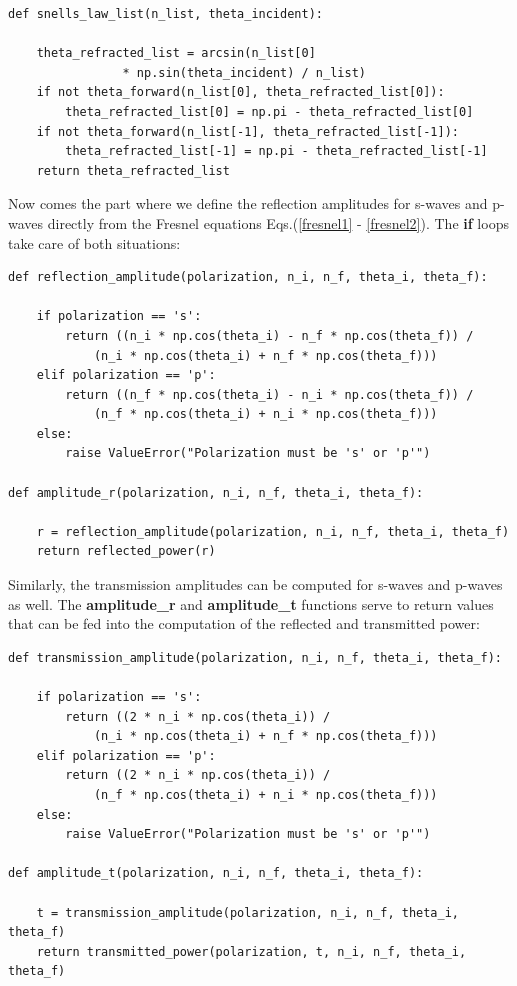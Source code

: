 \documentclass[preprint, onecolumn, amsmath, amssymb, aps]{revtex4-1}
\numberwithin{equation}{section}
\begin{document}
\lstset{showspaces=false,showstringspaces=false}%
\begin{lstlisting}
def snells_law_list(n_list, theta_incident):

	theta_refracted_list = arcsin(n_list[0] 
				* np.sin(theta_incident) / n_list)
	if not theta_forward(n_list[0], theta_refracted_list[0]):
		theta_refracted_list[0] = np.pi - theta_refracted_list[0]
	if not theta_forward(n_list[-1], theta_refracted_list[-1]):
		theta_refracted_list[-1] = np.pi - theta_refracted_list[-1]
	return theta_refracted_list
\end{lstlisting}
\noindent
Now comes the part where we define the reflection amplitudes for s-waves and p-waves directly from the Fresnel equations Eqs.(\ref{fresnel1} - \ref{fresnel2}). The \textbf{if} loops take care of both situations: 
\lstset{showspaces=false,showstringspaces=false}%
\begin{lstlisting}
def reflection_amplitude(polarization, n_i, n_f, theta_i, theta_f):

	if polarization == 's':
		return ((n_i * np.cos(theta_i) - n_f * np.cos(theta_f)) /
			(n_i * np.cos(theta_i) + n_f * np.cos(theta_f)))
	elif polarization == 'p':
		return ((n_f * np.cos(theta_i) - n_i * np.cos(theta_f)) /
			(n_f * np.cos(theta_i) + n_i * np.cos(theta_f)))
	else:
		raise ValueError("Polarization must be 's' or 'p'")

def amplitude_r(polarization, n_i, n_f, theta_i, theta_f):

	r = reflection_amplitude(polarization, n_i, n_f, theta_i, theta_f)
	return reflected_power(r)
\end{lstlisting}
\noindent
Similarly, the transmission amplitudes can be computed for s-waves and p-waves as well. The \textbf{amplitude\_r} and \textbf{amplitude\_t} functions serve to return values that can be fed into the computation of the reflected and transmitted power:
\lstset{showspaces=false,showstringspaces=false}%
\begin{lstlisting}
def transmission_amplitude(polarization, n_i, n_f, theta_i, theta_f):

	if polarization == 's':
		return ((2 * n_i * np.cos(theta_i)) / 
			(n_i * np.cos(theta_i) + n_f * np.cos(theta_f)))
	elif polarization == 'p':
		return ((2 * n_i * np.cos(theta_i)) / 
			(n_f * np.cos(theta_i) + n_i * np.cos(theta_f)))
	else:
		raise ValueError("Polarization must be 's' or 'p'")

def amplitude_t(polarization, n_i, n_f, theta_i, theta_f):

	t = transmission_amplitude(polarization, n_i, n_f, theta_i, theta_f)
	return transmitted_power(polarization, t, n_i, n_f, theta_i, theta_f)
\end{lstlisting}
\end{document}
